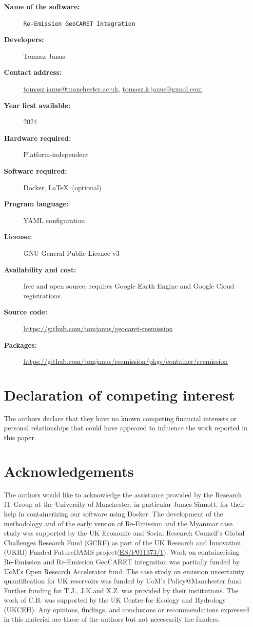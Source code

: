 \documentclass[final,1p,times]{elsarticle}
\begin{document}
\begin{description}
  \item[\textbf{Name of the software:}] \texttt{Re-Emission GeoCARET Integration}
  \item[\textbf{Developers:}] Tomasz Janus
  \item[\textbf{Contact address:}] \href{mailto:tomasz.janus@manchester.ac.uk}{tomasz.janus@manchester.ac.uk}, \href{mailto:tomasz.k.janus@gmail.com}{tomasz.k.janus@gmail.com}
  \item[\textbf{Year first available:}] 2024
  \item[\textbf{Hardware required:}] Platform-independent
  \item[\textbf{Software required:}] Docker, \LaTeX \, (optional)
  \item[\textbf{Program language:}] YAML configuration
  \item[\textbf{License:}] GNU General Public Licence v3
  \item[\textbf{Availability and cost:}] free and open source, requires Google Earth Engine and Google Cloud registrations
  \item[\textbf{Source code:}] \href{https://github.com/tomjanus/geocaret-reemission}{https://github.com/tomjanus/geocaret-reemission}
  \item[\textbf{Packages:}] \href{https://github.com/tomjanus/reemission/pkgs/container/reemission}{https://github.com/tomjanus/reemission/pkgs/container/reemission}
\end{description}

\section{Declaration of competing interest}
The authors declare that they have no known competing financial interests or personal relationships that could have appeared to influence the work reported in this paper.

\section{Acknowledgements}
The authors would like to acknowledge the assistance provided by the Research IT Group at the University of Manchester, in particular James Sinnott, for their help in containerizing our software using Docker.
The development of the methodology and of the early version of Re-Emission and the Myanmar case study was supported by the UK Economic and Social Research Council's Global Challenges Research Fund (GCRF) as part of the UK Research and Innovation (UKRI) Funded FutureDAMS project(\href{www.futuredams.org}{ES/P011373/1}).
Work on containerising Re-Emission and Re-Emission GeoCARET integration was partially funded by UoM's Open Research Accelerator fund.
The case study on emission uncertainty quantification for UK reservoirs was funded by UoM's Policy@Manchester fund.
Further funding for T.J., J.K.and X.Z. was provided by their institutions. 
The work of C.B. was supported by the UK Centre for Ecology and Hydrology (UKCEH). 
Any opinions, findings, and conclusions or recommendations expressed in this material are those of the authors but not necessarily the funders.
\end{document}
